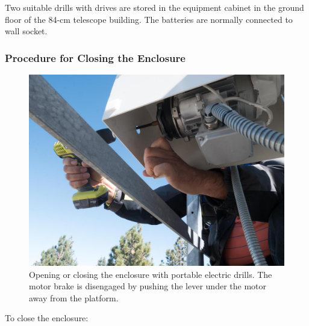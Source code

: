Two suitable drills with drives are stored in the {\projectname} equipment cabinet in the ground floor of the 84-cm telescope building. The batteries are normally connected to wall socket.

\subsubsection{Procedure for Closing the Enclosure}


\begin{figure}
\begin{center}
\includegraphics[width=0.7\linewidth]{figures/enclosure-closing-with-drills.jpg}
\end{center}
\caption{Opening or closing the enclosure with portable electric drills. The motor brake is disengaged by pushing the lever under the motor away from the platform.}
\label{figure:enclosure-closing-with-drills}
\end{figure}

To close the enclosure:


